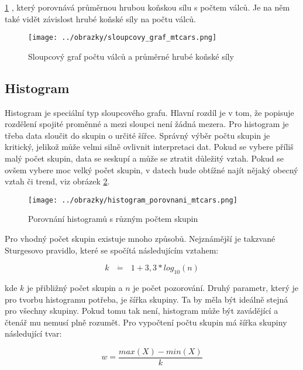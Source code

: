 \ref{fig:sloupcovy_graf_mtcars}
, který porovnává průměrnou hrubou koňskou sílu s počtem válců.
Je na něm také vidět závislost hrubé koňské síly na počtu válců.

\begin{figure}[H]
    \centering
    \texttt{[image: ../obrazky/sloupcovy\_graf\_mtcars.png]}
    \caption{Sloupcový graf počtu válců a průměrné hrubé koňské síly} 
    \label{fig:sloupcovy_graf_mtcars}
\end{figure}

\subsection{Histogram}

Histogram je speciální typ sloupcového grafu. Hlavní rozdíl je v tom, že popisuje rozdělení spojité proměnné a mezi sloupci není žádná mezera.
Pro histogram je třeba data sloučit do skupin o určité šířce. Správný výběr počtu skupin je kritický, jelikož může velmi
silně ovlivnit interpretaci dat. Pokud se vybere příliš malý počet skupin, data se seskupí a může se ztratit důležitý vztah. Pokud se ovšem
vybere moc velký počet skupin, v datech bude obtížné najít nějaký obecný vztah či trend,
viz obrázek \ref{fig:histogram_porovnani_mtcars}.

\begin{figure}[H]
    \centering
    \texttt{[image: ../obrazky/histogram\_porovnani\_mtcars.png]}
    \caption{Porovnání histogramů s různým počtem skupin} 
    \label{fig:histogram_porovnani_mtcars}
\end{figure}

Pro vhodný počet skupin existuje mnoho způsobů. Nejznámější je takzvané Sturgesovo pravidlo, které se spočítá následujícím vztahem:

\begin{equation}
    \label{eq:sturgesovo_pravidlo}
    k \text{ } \dot{\mathbf{=}} \text{ } 1 + 3,3 * log_{10}(n)
\end{equation}

kde $k$ je přibližný počet skupin a $n$ je počet pozorování. Druhý parametr, který je pro tvorbu histogramu potřeba, je šířka skupiny.
Ta by měla být ideálně stejná pro všechny skupiny. Pokud tomu tak není, histogram může být zavádějící a čtenář mu nemusí plně rozumět.
Pro vypočtení počtu skupin má šířka skupiny následující tvar:

\begin{equation*}
    w = \frac{max(X) - min(X)}{k}
\end{equation*}

